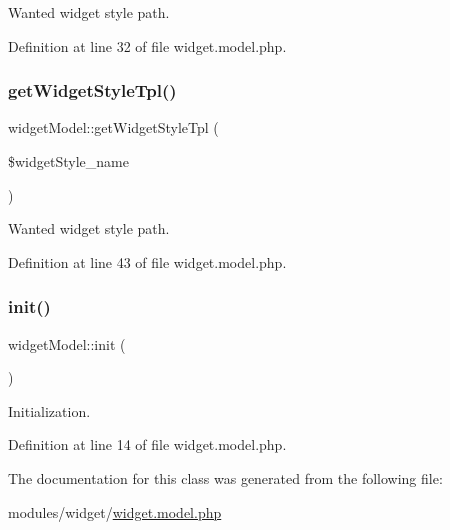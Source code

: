 Wanted widget style path. 



Definition at line 32 of file widget.\+model.\+php.

\mbox{\label{classwidgetModel_a772aadab9c4dd23780bc3de738f63829}} 
\subsubsection{\texorpdfstring{get\+Widget\+Style\+Tpl()}{getWidgetStyleTpl()}}
{\footnotesize\ttfamily widget\+Model\+::get\+Widget\+Style\+Tpl (\begin{DoxyParamCaption}\item[{}]{\$widget\+Style\+\_\+name }\end{DoxyParamCaption})}



Wanted widget style path. 



Definition at line 43 of file widget.\+model.\+php.

\mbox{\label{classwidgetModel_a7bfe5611dc4916771b7ec2c148581f29}} 
\subsubsection{\texorpdfstring{init()}{init()}}
{\footnotesize\ttfamily widget\+Model\+::init (\begin{DoxyParamCaption}{ }\end{DoxyParamCaption})}



Initialization. 



Definition at line 14 of file widget.\+model.\+php.



The documentation for this class was generated from the following file\+:\begin{DoxyCompactItemize}
\item 
modules/widget/\hyperlink{widget_8model_8php}{widget.\+model.\+php}\end{DoxyCompactItemize}
